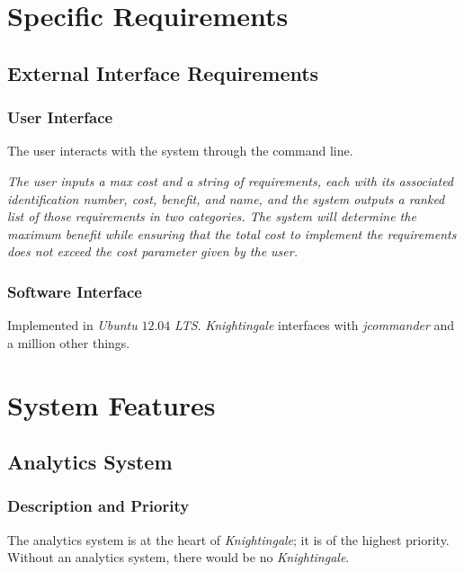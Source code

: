 \documentclass[a4paper, 12pt]{article}
\begin{document}
\section{Specific Requirements} \label{sec:specificreq}
\subsection{External Interface Requirements} \label{sec:eir}
\subsubsection{User Interface} \label{sec:ui}
\begin{adjustwidth}{3em}{0pt}
The user interacts with the system through the command line. \newline

\noindent \textit{The user inputs a max cost and a string of 
requirements, each with its associated identification number, cost, benefit, and name, and the system outputs 
a ranked list of those requirements in two categories. The system will determine the maximum benefit while 
ensuring that the total cost to implement the requirements does not exceed the cost 
parameter given by the user.}
\end{adjustwidth}

\subsubsection{Software Interface} \label{sec:softi}
\begin{adjustwidth}{3em}{0pt}
Implemented in \textit{Ubuntu} $12.04$ \textit{LTS}. \textit{Knightingale} interfaces with \textit{jcommander} and a million other things.
\end{adjustwidth}

\section{System Features} \label{sec:sysfeat}
\subsection{Analytics System} \label{sec:analytics}
\subsubsection{Description and Priority} \label{sec:description}
\begin{adjustwidth}{3em}{0pt}
The analytics system is at the heart of \textit{Knightingale}; it is of the highest priority. Without an analytics system, there would be no \textit{Knightingale}.
\end{adjustwidth}
\end{document}
